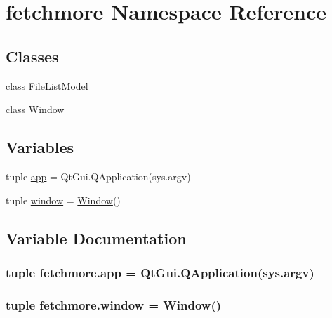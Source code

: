 \hypertarget{namespacefetchmore}{}\section{fetchmore Namespace Reference}
\label{namespacefetchmore}
\subsection*{Classes}
\begin{DoxyCompactItemize}
\item 
class \hyperlink{classfetchmore_1_1FileListModel}{File\+List\+Model}
\item 
class \hyperlink{classfetchmore_1_1Window}{Window}
\end{DoxyCompactItemize}
\subsection*{Variables}
\begin{DoxyCompactItemize}
\item 
tuple \hyperlink{namespacefetchmore_a988c9a3b3f29136a630607b2fc6fd7e0}{app} = Qt\+Gui.\+Q\+Application(sys.\+argv)
\item 
tuple \hyperlink{namespacefetchmore_a428cd6aa8add04cd704097b21474f19d}{window} = \hyperlink{classfetchmore_1_1Window}{Window}()
\end{DoxyCompactItemize}


\subsection{Variable Documentation}
\hypertarget{namespacefetchmore_a988c9a3b3f29136a630607b2fc6fd7e0}{}
\subsubsection[{app}]{\setlength{\rightskip}{0pt plus 5cm}tuple fetchmore.\+app = Qt\+Gui.\+Q\+Application(sys.\+argv)}\label{namespacefetchmore_a988c9a3b3f29136a630607b2fc6fd7e0}
\hypertarget{namespacefetchmore_a428cd6aa8add04cd704097b21474f19d}{}
\subsubsection[{window}]{\setlength{\rightskip}{0pt plus 5cm}tuple fetchmore.\+window = {\bf Window}()}\label{namespacefetchmore_a428cd6aa8add04cd704097b21474f19d}
